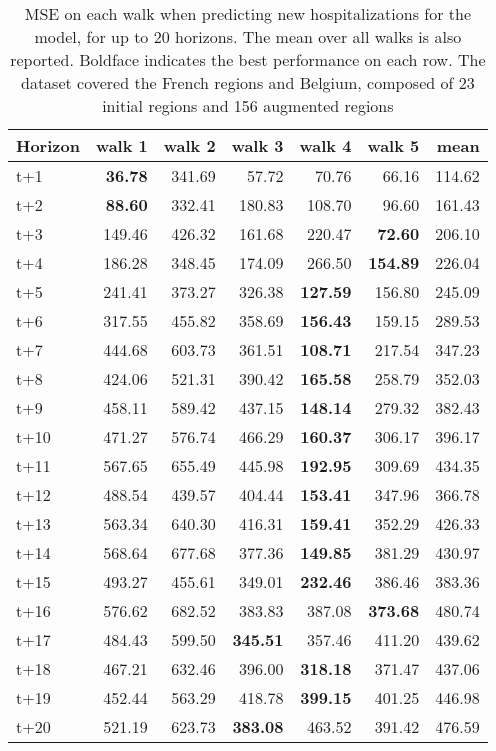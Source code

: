 \begin{table}[H]
\centering
\caption{MSE on each walk when predicting new hospitalizations for the model, for up to 20 horizons. The mean over all walks is also reported. Boldface indicates the best performance on each row. The dataset covered the French regions and Belgium, composed of 23 initial regions and 156 augmented regions }
\label{tab:MSE_walk_dense_model}
\begin{tabular}{lrrrrrr}
\toprule
Horizon &  walk 1 &  walk 2 &  walk 3 &  walk 4 &  walk 5 &   mean \\
\midrule
t+1  & \textbf{36.78}  & 341.69  & 57.72  & 70.76  & 66.16  & 114.62  \\
t+2  & \textbf{88.60}  & 332.41  & 180.83  & 108.70  & 96.60  & 161.43  \\
t+3  & 149.46  & 426.32  & 161.68  & 220.47  & \textbf{72.60}  & 206.10  \\
t+4  & 186.28  & 348.45  & 174.09  & 266.50  & \textbf{154.89}  & 226.04  \\
t+5  & 241.41  & 373.27  & 326.38  & \textbf{127.59}  & 156.80  & 245.09  \\
t+6  & 317.55  & 455.82  & 358.69  & \textbf{156.43}  & 159.15  & 289.53  \\
t+7  & 444.68  & 603.73  & 361.51  & \textbf{108.71}  & 217.54  & 347.23  \\
t+8  & 424.06  & 521.31  & 390.42  & \textbf{165.58}  & 258.79  & 352.03  \\
t+9  & 458.11  & 589.42  & 437.15  & \textbf{148.14}  & 279.32  & 382.43  \\
t+10  & 471.27  & 576.74  & 466.29  & \textbf{160.37}  & 306.17  & 396.17  \\
t+11  & 567.65  & 655.49  & 445.98  & \textbf{192.95}  & 309.69  & 434.35  \\
t+12  & 488.54  & 439.57  & 404.44  & \textbf{153.41}  & 347.96  & 366.78  \\
t+13  & 563.34  & 640.30  & 416.31  & \textbf{159.41}  & 352.29  & 426.33  \\
t+14  & 568.64  & 677.68  & 377.36  & \textbf{149.85}  & 381.29  & 430.97  \\
t+15  & 493.27  & 455.61  & 349.01  & \textbf{232.46}  & 386.46  & 383.36  \\
t+16  & 576.62  & 682.52  & 383.83  & 387.08  & \textbf{373.68}  & 480.74  \\
t+17  & 484.43  & 599.50  & \textbf{345.51}  & 357.46  & 411.20  & 439.62  \\
t+18  & 467.21  & 632.46  & 396.00  & \textbf{318.18}  & 371.47  & 437.06  \\
t+19  & 452.44  & 563.29  & 418.78  & \textbf{399.15}  & 401.25  & 446.98  \\
t+20  & 521.19  & 623.73  & \textbf{383.08}  & 463.52  & 391.42  & 476.59  \\

\bottomrule
\end{tabular}
\end{table}
